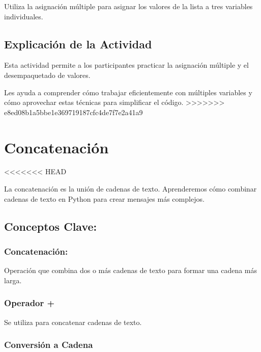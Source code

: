 \documentclass[
  a4paper,
  onepage,
  openany]{scrreprt}
\begin{document}
Utiliza la asignación múltiple para asignar los valores de la lista a
tres variables individuales.

\hypertarget{explicaciuxf3n-de-la-actividad-11}{%
\section{Explicación de la
Actividad}\label{explicaciuxf3n-de-la-actividad-11}}

Esta actividad permite a los participantes practicar la asignación
múltiple y el desempaquetado de valores.

Les ayuda a comprender cómo trabajar eficientemente con múltiples
variables y cómo aprovechar estas técnicas para simplificar el código.
\textgreater\textgreater\textgreater\textgreater\textgreater\textgreater\textgreater{}
e8ed08b1a5bbe1e369719187cfc4de7f7e2a41a9

\hypertarget{concatenaciuxf3n}{%
\chapter{Concatenación}\label{concatenaciuxf3n}}

\textless\textless\textless\textless\textless\textless\textless{} HEAD

La concatenación es la unión de cadenas de texto. Aprenderemos cómo
combinar cadenas de texto en Python para crear mensajes más complejos.

\hypertarget{conceptos-clave-14}{%
\section{Conceptos Clave:}\label{conceptos-clave-14}}

\hypertarget{concatenaciuxf3n-1}{%
\subsection{Concatenación:}\label{concatenaciuxf3n-1}}

Operación que combina dos o más cadenas de texto para formar una cadena
más larga.

\hypertarget{operador}{%
\subsection{Operador +}\label{operador}}

Se utiliza para concatenar cadenas de texto.

\hypertarget{conversiuxf3n-a-cadena}{%
\subsection{Conversión a Cadena}\label{conversiuxf3n-a-cadena}}
\end{document}
